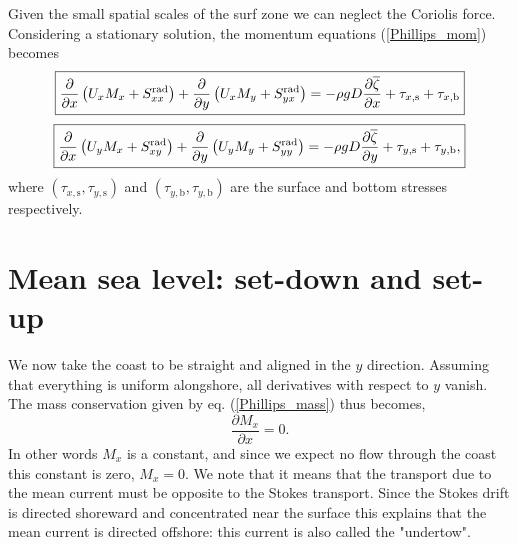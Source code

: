 Given the small spatial scales of the surf zone we can neglect the Coriolis force. Considering a stationary solution, the momentum equations  (\ref{Phillips_mom}) becomes 
\begin{equation}
\fbox{$\displaystyle \frac{\partial }{\partial x}\left(U_x M_x+S^{\mathrm{rad}}_{xx}\right)
    +\frac{\partial }{\partial y}\left(U_x M_y+S^{\mathrm{rad}}_{yx}\right)
     =  -\rho g D  \frac{\partial \overline{\zeta}}{\partial x}
        + \tau_{x,{\mathrm s}}  + \tau_{x,{\mathrm b}}$} \label{xmomentum}
\end{equation}
\begin{equation}
\fbox{$\displaystyle \frac{\partial }{\partial x}\left(U_y M_x+S^{\mathrm{rad}}_{xy}\right)
    +\frac{\partial }{\partial y}\left(U_y M_y+S^{\mathrm{rad}}_{yy}\right)
     =  -\rho g D  \frac{\partial \overline{\zeta}}{\partial y}
        + \tau_{y,{\mathrm s}}  + \tau_{y,{\mathrm b}}, $} \label{ymomentum}
\end{equation}
where $\left(\tau_{x,{\mathrm s}},\tau_{y,{\mathrm s}}\right)$ and
$\left(\tau_{y,{\mathrm b}},\tau_{y,{\mathrm b}}\right)$ are the surface and bottom stresses respectively.

\section{Mean sea level: set-down and set-up}
We now take the coast to be straight and aligned in the $y$ direction. Assuming that everything is uniform alongshore, all derivatives with respect to $y$ vanish. The mass conservation given by eq. (\ref{Phillips_mass})  thus becomes, 
\begin{equation}
  \frac{\partial M_x}{\partial x} = 0.
\end{equation}
In other words  $M_x$ is a constant, and since we expect no flow through the coast 
this constant is zero,  $M_x=0$.
We note that it means that the transport due to the mean current must be opposite to the 
Stokes transport. Since the Stokes drift is directed shoreward and concentrated near the surface this explains that the mean current is directed offshore: this current is also called the "undertow".

